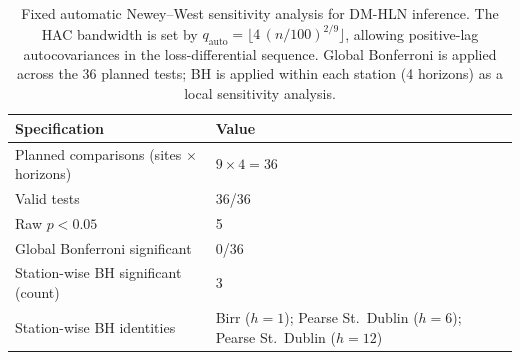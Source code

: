 \begin{table}[t]
\centering
\small
\caption{Fixed automatic Newey--West sensitivity analysis for DM-HLN inference.
The HAC bandwidth is set by $q_{\text{auto}}=\lfloor 4\,(n/100)^{2/9}\rfloor$, allowing positive-lag autocovariances in the loss-differential sequence.  Global Bonferroni is applied across the 36 planned tests; BH is applied within each station (4 horizons) as a local sensitivity analysis.}
\label{tab:dm_auto_nw}
\begin{tabular}{p{}p{}}
\toprule
Specification & Value \\
\midrule
Planned comparisons (sites $\times$ horizons) & $9\times 4 = 36$ \\
Valid tests & 36/36 \\
Raw $p<0.05$ & 5 \\
Global Bonferroni significant & 0/36 \\
Station-wise BH significant (count) & 3 \\
Station-wise BH identities & Birr ($h=1$); Pearse St.\ Dublin ($h=6$); Pearse St.\ Dublin ($h=12$) \\
\bottomrule
\end{tabular}
\end{table}
